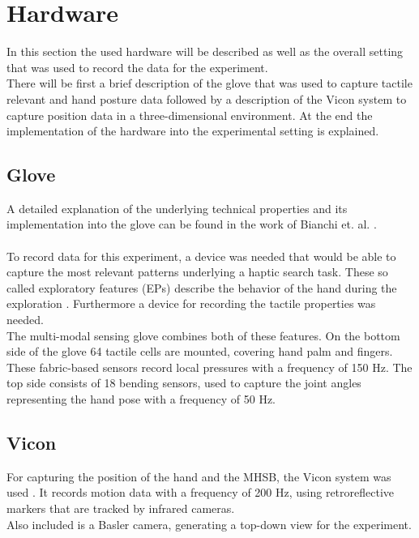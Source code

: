 \section{Hardware} \label{Hardware}
In this section the used hardware will be described as well as the overall setting that was used to record the data for the experiment.\\
There will be first a brief description of the glove that was used to capture tactile relevant and hand posture data followed by a description of the Vicon system to capture position data in a three-dimensional environment. At the end the implementation of the hardware into the experimental setting is explained.

\subsection{Glove}
A detailed explanation of the underlying technical properties and its implementation into the glove can be found in the work of Bianchi et. al. \cite{Glove}.\\
\\
To record data for this experiment, a device was needed that would be able to capture the most relevant patterns underlying a haptic search task. These so called exploratory features (EPs) describe the behavior of the hand during the exploration \cite{EPs}. Furthermore a device for recording the tactile properties was needed.\\
The multi-modal sensing glove combines both of these features. On the bottom side of the glove 64 tactile cells are mounted, covering hand palm and fingers. These fabric-based sensors record local pressures with a frequency of 150 Hz. The top side consists of 18 bending sensors, used to capture the joint angles representing the hand pose with a frequency of 50 Hz.
 
\subsection{Vicon}
For capturing the position of the hand and the MHSB, the Vicon system was used \cite{Vicon}. It records motion data with a frequency of 200 Hz, using retroreflective markers that are tracked by infrared cameras.\\
Also included is a Basler camera, generating a top-down view for the experiment.

